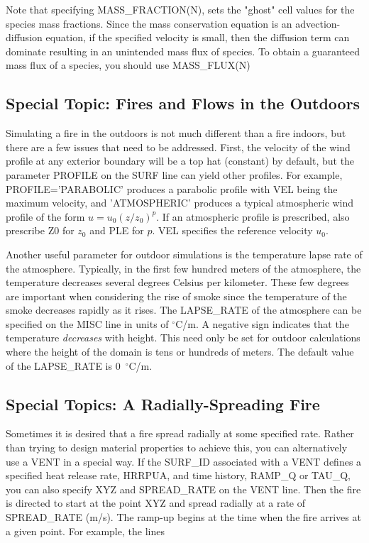 \documentclass[11pt]{book}
\begin{document}
\begin{warning}
\noindent
Note that specifying {\ct MASS\_FRACTION(N)}, sets the "ghost" cell values for the species
mass fractions.  Since the mass conservation equation is an advection-diffusion equation,
if the specified velocity is small, then the diffusion term can dominate resulting in an unintended
mass flux of species.  To obtain a guaranteed mass flux of a species, you should use {\ct MASS\_FLUX(N)}
\end{warning}


\subsection{Special Topic: Fires and Flows in the Outdoors}

Simulating a fire in the outdoors is not much different than a fire
indoors, but there are a few issues that need to be addressed.
First, the velocity of the wind profile at any exterior boundary will be a top hat (constant) by default,
but the parameter {\ct PROFILE} on the {\ct SURF} line
can yield other profiles.
For example, {\ct PROFILE='PARABOLIC'} produces a parabolic profile with
{\ct VEL} being the maximum velocity,
and {\ct 'ATMOSPHERIC'} produces a typical atmospheric wind
profile of the form $u=u_0 (z/z_0)^p$. If an atmospheric profile is
prescribed, also prescribe {\ct Z0} for $z_0$  and {\ct PLE} for $p$.
{\ct VEL} specifies the reference velocity $u_0$.

Another useful parameter for outdoor simulations is the temperature
lapse rate of the atmosphere. Typically, in the first few hundred meters
of the atmosphere, the temperature decreases several degrees Celsius
per kilometer. These few degrees are important when considering the rise
of smoke since the temperature of the smoke decreases rapidly as it
rises. The {\ct LAPSE\_RATE} of the atmosphere can be specified on the
{\ct MISC} line in units of $^\circ$C/m. A negative sign indicates that the
temperature {\em decreases} with height.
This need only be set for outdoor calculations where the height of the
domain is tens or hundreds of meters.
The default value of the {\ct LAPSE\_RATE} is 0~$^\circ$C/m.


\subsection{Special Topics: A Radially-Spreading Fire}

Sometimes it is desired that a fire spread radially at some specified
rate. Rather than trying to design material properties
to achieve this, you can alternatively use a {\ct VENT} in a special way.
If the {\ct SURF\_ID} associated with a {\ct VENT}
defines a specified heat release rate, {\ct HRRPUA}, and
time history, {\ct RAMP\_Q} or {\ct TAU\_Q}, you can also specify {\ct
XYZ} and {\ct SPREAD\_RATE} on the {\ct VENT} line.
Then the fire is directed to start at the point {\ct XYZ} and spread
radially at a rate of {\ct SPREAD\_RATE} (m/s). The ramp-up begins at
the time when the fire arrives at a given point.
For example, the lines
\end{document}
